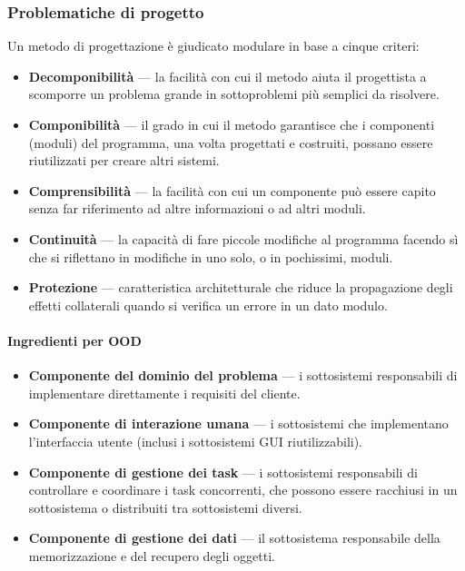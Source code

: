 \documentclass[a4paper,12pt]{article}
\begin{document}
\subsubsection{Problematiche di progetto}
Un metodo di progettazione è giudicato modulare in base a cinque criteri:
\begin{itemize}
  \item \textbf{Decomponibilità} --- la facilità con cui il metodo aiuta il progettista a
        scomporre un problema grande in sottoproblemi più semplici da risolvere.
  \item \textbf{Componibilità} --- il grado in cui il metodo garantisce che i componenti
        (moduli) del programma, una volta progettati e costruiti, possano essere
        riutilizzati per creare altri sistemi.
  \item \textbf{Comprensibilità} --- la facilità con cui un componente può essere capito
        senza far riferimento ad altre informazioni o ad altri moduli.
  \item \textbf{Continuità} --- la capacità di fare piccole modifiche al programma
        facendo sì che si riflettano in modifiche in uno solo, o in pochissimi, moduli.
  \item \textbf{Protezione} --- caratteristica architetturale che riduce la propagazione
        degli effetti collaterali quando si verifica un errore in un dato modulo.
\end{itemize}

\paragraph{Ingredienti per OOD}
\begin{itemize}
  \item \textbf{Componente del dominio del problema} --- i sottosistemi responsabili di
        implementare direttamente i requisiti del cliente.
  \item \textbf{Componente di interazione umana} --- i sottosistemi che implementano
        l'interfaccia utente (inclusi i sottosistemi GUI riutilizzabili).
  \item \textbf{Componente di gestione dei task} --- i sottosistemi responsabili di
        controllare e coordinare i task concorrenti, che possono essere racchiusi in un
        sottosistema o distribuiti tra sottosistemi diversi.
  \item \textbf{Componente di gestione dei dati} --- il sottosistema responsabile della
        memorizzazione e del recupero degli oggetti.
\end{itemize}
\end{document}
